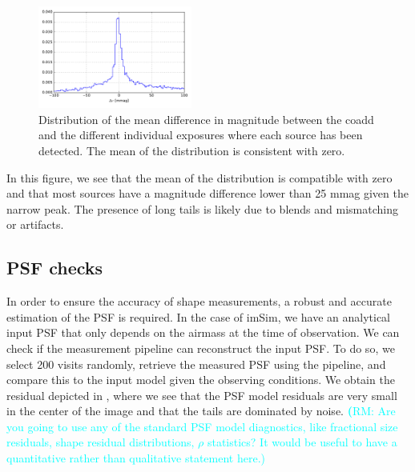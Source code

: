 \documentclass[twocolumn]{aastex62}
\newcommand{\rachel}[1]{{\textcolor{cyan}{{\textbf (RM: #1)}}}}
\begin{document}
\begin{figure}
  \centering
  \includegraphics[width=0.45\textwidth]{photometry_internal_10visits_imsim_undithered}
  \caption{Distribution of the mean difference in magnitude between the coadd and the different individual exposures
  where each source has been detected. The mean of the distribution is consistent with zero.}
  \label{fig:internal_photometry_a}
\end{figure}

In this figure, we see that the mean of the distribution is compatible with zero and that most sources have a magnitude difference lower
than 25 mmag given the narrow peak. The presence of long tails is likely due to blends and mismatching or artifacts.

\subsection{PSF checks}
\label{sec:psf_checks}

In order to ensure the accuracy of shape measurements, a robust and accurate estimation of the PSF is required. In the case of imSim, we have
an analytical input PSF that only depends on the airmass at the time of observation. We can check if the measurement pipeline can reconstruct
the input PSF. To do so, we select 200 visits randomly, retrieve the measured PSF using the pipeline, and compare this
to the input model given the observing conditions. We obtain the residual depicted in , where we see that the PSF model residuals are very small in the center of the image and that the tails are dominated by noise. \rachel{Are you going to use any of the standard PSF model diagnostics, like fractional size residuals, shape residual distributions, $\rho$ statistics?  It would be useful to have a quantitative rather than qualitative statement here.}
\end{document}
